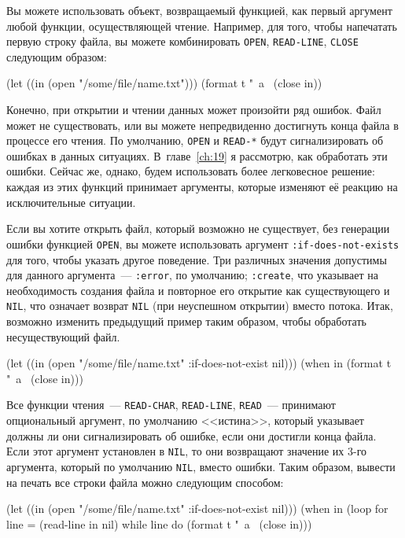 Вы можете использовать объект, возвращаемый функцией, как первый аргумент любой функции,
осуществляющей чтение. Например, для того, чтобы напечатать первую строку файла, вы можете
комбинировать \lstinline{OPEN}, \lstinline{READ-LINE}, \lstinline{CLOSE} следующим образом:

\begin{myverb}
(let ((in (open "/some/file/name.txt")))
  (format t "~a~%
  (close in))
\end{myverb}

Конечно, при открытии и чтении данных может произойти ряд ошибок. Файл может не
существовать, или вы можете непредвиденно достигнуть конца файла в процессе его чтения. По
умолчанию, \lstinline{OPEN} и \lstinline{READ-*} будут сигнализировать об ошибках в данных
ситуациях. В~главе~\ref{ch:19} я рассмотрю, как обработать эти ошибки. Сейчас же, однако, будем
использовать более легковесное решение: каждая из этих функций принимает аргументы,
которые изменяют её реакцию на исключительные ситуации.

Если вы хотите открыть файл, который возможно не существует, без генерации ошибки
функцией \lstinline{OPEN}, вы можете использовать аргумент \lstinline{:if-does-not-exists} для того,
чтобы указать другое поведение. Три различных значения допустимы для данного аргумента~---
\lstinline{:error}, по умолчанию; \lstinline{:create}, что указывает на необходимость создания файла
и повторное его открытие как существующего и \lstinline{NIL}, что означает возврат \lstinline{NIL}
(при неуспешном открытии) вместо потока. Итак, возможно изменить предыдущий пример таким
образом, чтобы обработать несуществующий файл.

\begin{myverb}
(let ((in (open "/some/file/name.txt" :if-does-not-exist nil)))
  (when in
    (format t "~a~%
    (close in)))
\end{myverb}

Все функции чтения~--- \lstinline{READ-CHAR}, \lstinline{READ-LINE}, \lstinline{READ}~--- принимают
опциональный аргумент, по умолчанию <<истина>>, который указывает должны ли они
сигнализировать об ошибке, если они достигли конца файла. Если этот аргумент установлен в
\lstinline{NIL}, то они возвращают значение их 3-го аргумента, который по умолчанию \lstinline{NIL},
вместо ошибки. Таким образом, вывести на печать все строки файла можно следующим способом:

\begin{myverb}
(let ((in (open "/some/file/name.txt" :if-does-not-exist nil)))
  (when in
    (loop for line = (read-line in nil)
         while line do (format t "~a~%
    (close in)))
\end{myverb}

